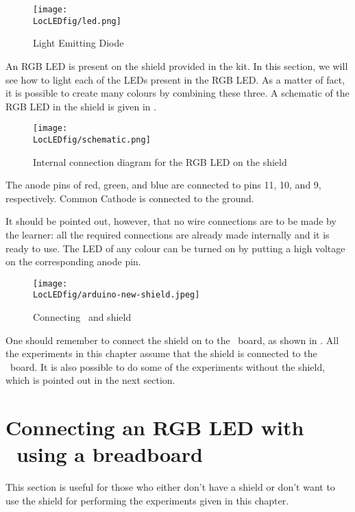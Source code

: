 \begin{figure}
  \centering
  \texttt{[image: \\LocLEDfig/led.png]}
  \caption{Light Emitting Diode}
  \label{fig:ledsym}
\end{figure}

An RGB LED is present on the shield provided in the kit.  In this
section, we will see how to light each of the LEDs present in the RGB
LED.  As a matter of fact, it is possible to create many colours by
combining these three.  A schematic of the RGB LED in the shield is
given in .
\begin{figure}
  \centering
  \texttt{[image: \\LocLEDfig/schematic.png]}
  \caption{Internal connection diagram for the RGB LED on the shield}
  \label{fig:ledblock}
\end{figure}
The anode pins of red, green, and blue are connected to pins 11, 10, and 9, 
respectively. Common Cathode is connected to the ground.

It should be pointed out, however, that no wire connections are to be
made by the learner: all the required connections are already made internally 
and it is ready to use.  The LED of any colour can be turned on by
putting a high voltage on the corresponding anode pin.

\begin{figure}
  \centering
  \texttt{[image: \\LocLEDfig/arduino-new-shield.jpeg]}
  \caption{Connecting \arduino\ and shield}
  \label{fig:uno-shield-connect}
\end{figure}

One should remember to connect the shield on to the \arduino\ board, as
shown in . All the experiments in this
chapter assume that the shield is connected to the \arduino\ board.
It is also possible to do some of the experiments without the shield,
which is pointed out in the next section. 

\section{Connecting an RGB LED with \arduino\ using a breadboard}
This section is useful for those who either don't have a shield or don't want to use the shield
for performing the experiments given in this chapter. 

